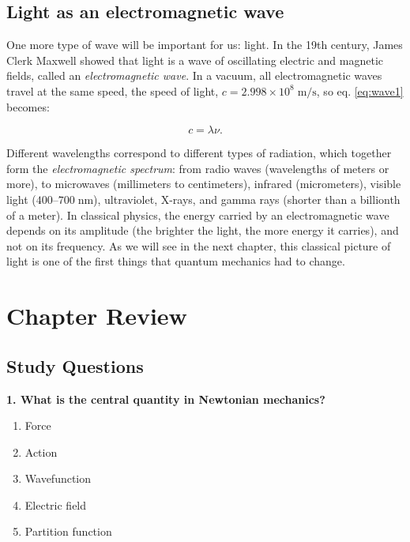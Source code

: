 \documentclass[
  english,
  9pt,
]{extbook}
\providecommand{\tightlist}{%
  \setlength{\itemsep}{0pt}\setlength{\parskip}{0pt}}
\theoremstyle{definition}
\theoremstyle{definition}
\theoremstyle{definition}
\theoremstyle{definition}
\theoremstyle{remark}
\begin{document}
\subsection{Light as an electromagnetic wave}\label{light-as-an-electromagnetic-wave}

One more type of wave will be important for us: light. In the 19th century, James Clerk Maxwell showed that light is a wave of oscillating electric and magnetic fields, called an \emph{electromagnetic wave}. In a vacuum, all electromagnetic waves travel at the same speed, the speed of light, \(c=2.998\times10^8\;\text{m/s}\), so eq. \eqref{eq:wave1} becomes:

\begin{equation}
c = \lambda\nu.
\label{eq:light1}
\end{equation}

Different wavelengths correspond to different types of radiation, which together form the \emph{electromagnetic spectrum}: from radio waves (wavelengths of meters or more), to microwaves (millimeters to centimeters), infrared (micrometers), visible light (\(400\)--\(700\;\text{nm}\)), ultraviolet, X-rays, and gamma rays (shorter than a billionth of a meter). In classical physics, the energy carried by an electromagnetic wave depends on its amplitude (the brighter the light, the more energy it carries), and not on its frequency. As we will see in the next chapter, this classical picture of light is one of the first things that quantum mechanics had to change.

\section{Chapter Review}\label{rev1}

\subsection{Study Questions}\label{quest1}

\textbf{1. What is the central quantity in Newtonian mechanics?}

\begin{enumerate}
\def\labelenumi{\alph{enumi}.}
\tightlist
\item
  Force\\
\item
  Action\\
\item
  Wavefunction\\
\item
  Electric field\\
\item
  Partition function
\end{enumerate}
\end{document}
